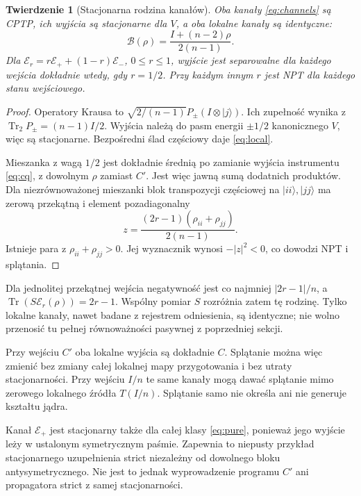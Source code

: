 \documentclass[11pt,a4paper]{article}
\newtheorem{theorem}{Twierdzenie}
\newcommand{\Tr}{\operatorname{Tr}}
\begin{document}
\begin{theorem}[Stacjonarna rodzina kanałów]\label{thm:channels}
Oba kanały \eqref{eq:channels} są CPTP, ich wyjścia są stacjonarne
dla $V$, a oba lokalne kanały są identyczne:
\begin{equation}\label{eq:local}
 \mathcal B(\rho)=\frac{I+(n-2)\rho}{2(n-1)}.
\end{equation}
Dla $\mathcal E_r=r\mathcal E_++(1-r)\mathcal E_-$,
$0\le r\le1$, wyjście jest separowalne dla każdego wejścia dokładnie
wtedy, gdy $r=1/2$. Przy każdym innym $r$ jest NPT dla każdego stanu wejściowego.
\end{theorem}

\begin{proof}
Operatory Krausa to
$\sqrt{2/(n-1)}P_\pm(I\otimes|j\rangle)$.
Ich zupełność wynika z $\Tr_2P_\pm=(n-1)I/2$.
Wyjścia należą do pasm energii $\pm1/2$ kanonicznego $V$, więc są
stacjonarne. Bezpośredni ślad częściowy daje \eqref{eq:local}.

Mieszanka z wagą $1/2$ jest dokładnie średnią po zamianie wyjścia
instrumentu \eqref{eq:cq}, z dowolnym $\rho$ zamiast $C'$.
Jest więc jawną sumą dodatnich produktów. Dla niezrównoważonej
mieszanki blok transpozycji częściowej na $|ii\rangle,|jj\rangle$
ma zerową przekątną i element pozadiagonalny
\[
 z=\frac{(2r-1)(\rho_{ii}+\rho_{jj})}{2(n-1)}.
\]
Istnieje para z $\rho_{ii}+\rho_{jj}>0$. Jej wyznacznik wynosi
$-|z|^2<0$, co dowodzi NPT i splątania.
\end{proof}

Dla jednolitej przekątnej wejścia negatywność jest co najmniej
$|2r-1|/n$, a $\Tr(S\mathcal E_r(\rho))=2r-1$.
Wspólny pomiar $S$ rozróżnia zatem tę rodzinę. Tylko lokalne kanały,
nawet badane z rejestrem odniesienia, są identyczne; nie wolno
przenosić tu pełnej równoważności pasywnej z poprzedniej sekcji.

Przy wejściu $C'$ oba lokalne wyjścia są dokładnie $C$.
Splątanie można więc zmienić bez zmiany całej lokalnej mapy przygotowania
i bez utraty stacjonarności. Przy wejściu $I/n$ te same kanały mogą
dawać splątanie mimo zerowego lokalnego źródła $T(I/n)$.
Splątanie samo nie określa ani nie generuje kształtu jądra.

Kanał $\mathcal E_+$ jest stacjonarny także dla całej klasy
\eqref{eq:pure}, ponieważ jego wyjście leży w ustalonym symetrycznym
paśmie. Zapewnia to niepusty przykład stacjonarnego uzupełnienia strict
niezależny od dowolnego bloku antysymetrycznego. Nie jest to jednak
wyprowadzenie programu $C'$ ani propagatora strict z samej stacjonarności.
\end{document}
